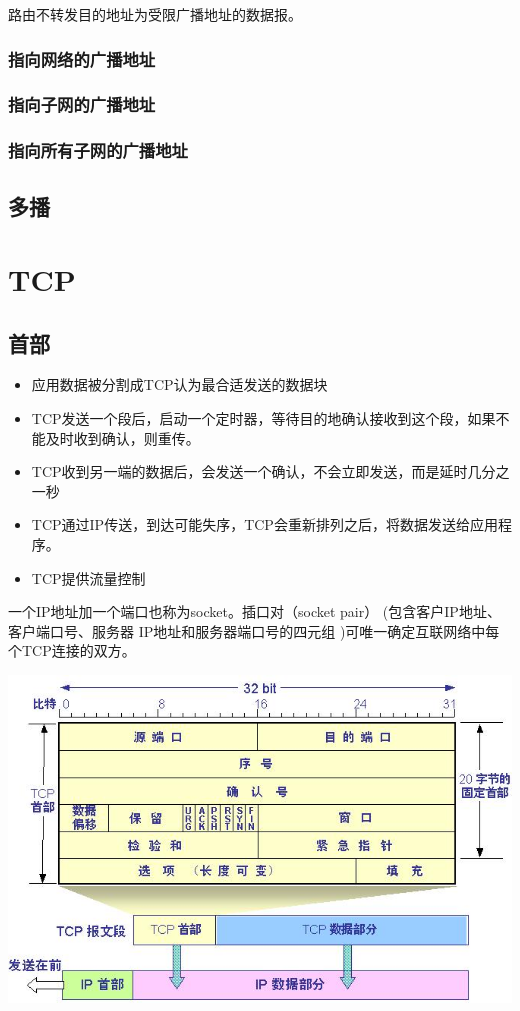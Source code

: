 路由不转发目的地址为受限广播地址的数据报。

\subsubsection{指向网络的广播地址}

\subsubsection{指向子网的广播地址}

\subsubsection{指向所有子网的广播地址}

\subsection{多播}



\section{TCP}

\subsection{首部}

\begin{itemize}
\item 应用数据被分割成TCP认为最合适发送的数据块
\item TCP发送一个段后，启动一个定时器，等待目的地确认接收到这个段，如果不能及时收到确认，则重传。
\item TCP收到另一端的数据后，会发送一个确认，不会立即发送，而是延时几分之一秒
\item TCP通过IP传送，到达可能失序，TCP会重新排列之后，将数据发送给应用程序。
\item TCP提供流量控制

\end{itemize}


一个IP地址加一个端口也称为socket。插口对（socket pair） (包含客户IP地址、客户端口号、服务器 IP地址和服务器端口号的四元组 )可唯一确定互联网络中每个TCP连接的双方。

\includegraphics[scale=3]{protocol/resources/TCP首部.jpg}



